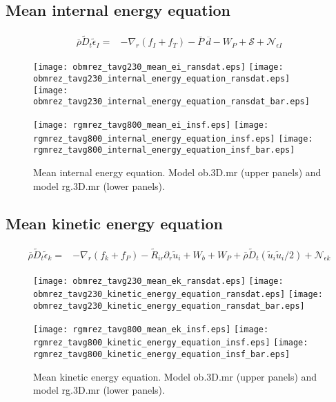 \documentclass[10pt,paper=a4]{report}
\newcommand{\fht}{\widetilde}
\newcommand{\fav}{\widetilde}
\newcommand{\av}{\overline}
\begin{document}
\newpage

\subsection{Mean internal energy equation}

\begin{align}
\av{\rho} \fav{D}_t \fav{\epsilon}_I = & - \nabla_r  ( f_I + f_T ) - \av{P} \ \av{d} - W_P  + {\mathcal S} + {\mathcal N_{\epsilon I}}
\end{align}

\begin{figure}[!h]
\centerline{
\texttt{[image: obmrez\_tavg230\_mean\_ei\_ransdat.eps]}
\texttt{[image: obmrez\_tavg230\_internal\_energy\_equation\_ransdat.eps]}
\texttt{[image: obmrez\_tavg230\_internal\_energy\_equation\_ransdat\_bar.eps]}}

\centerline{
\texttt{[image: rgmrez\_tavg800\_mean\_ei\_insf.eps]}                      
\texttt{[image: rgmrez\_tavg800\_internal\_energy\_equation\_insf.eps]}     
\texttt{[image: rgmrez\_tavg800\_internal\_energy\_equation\_insf\_bar.eps]}}
\caption{Mean internal energy equation. Model {\sf ob.3D.mr} (upper panels) and model {\sf rg.3D.mr} (lower panels). \label{fig:ei-equation}}
\end{figure}

\newpage

\subsection{Mean kinetic energy equation}

\begin{align}
\av{\rho} \fav{D}_t \fav{\epsilon}_k = &  -\nabla_r  ( f_k +  f_P ) - \fht{R}_{ir}\partial_r \fht{u}_i + W_b + W_P +\av{\rho}\fav{D}_t (\fav{u}_i \fav{u}_i / 2) + {\mathcal N_{\epsilon k}} \label{eq:rans_mke} 
\end{align}

\begin{figure}[!h]
\centerline{
\texttt{[image: obmrez\_tavg230\_mean\_ek\_ransdat.eps]}
\texttt{[image: obmrez\_tavg230\_kinetic\_energy\_equation\_ransdat.eps]}
\texttt{[image: obmrez\_tavg230\_kinetic\_energy\_equation\_ransdat\_bar.eps]}}

\centerline{
\texttt{[image: rgmrez\_tavg800\_mean\_ek\_insf.eps]}                      
\texttt{[image: rgmrez\_tavg800\_kinetic\_energy\_equation\_insf.eps]}     
\texttt{[image: rgmrez\_tavg800\_kinetic\_energy\_equation\_insf\_bar.eps]}}
\caption{Mean kinetic energy equation. Model {\sf ob.3D.mr} (upper panels) and model {\sf rg.3D.mr} (lower panels). \label{fig:ek-equation}}
\end{figure}
\end{document}
